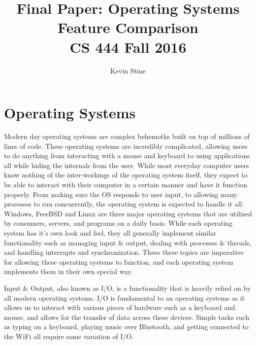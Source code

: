 \documentclass[letterpaper,10pt,draftclsnofoot,onecolumn,titlepage]{IEEEtran}
\def\name{Kevin Stine}
\begin{document}
	\title{\huge Final Paper: Operating Systems Feature Comparison\\CS 444 Fall 2016}
	\author{\large \name}
	\maketitle
	\newpage
	\section*{Operating Systems}
	Modern day operating systems are complex behemoths built on top of millions of lines of code.
	These operating systems are incredibly complicated, allowing users to do anything from interacting with a mouse and keyboard to using applications all while hiding the internals from the user.
	While most everyday computer users know nothing of the inter-workings of the operating system itself, they expect to be able to interact with their computer in a certain manner and have it function properly.
	From making sure the OS responds to user input, to allowing many processes to run concurrently, the operating system is expected to handle it all.
	Windows, FreeBSD and Linux are three major operating systems that are utilized by consumers, servers, and programs on a daily basis.
	While each operating system has it's own look and feel, they all generally implement similar functionality such as managing input \& output, dealing with processes \& threads, and handling interrupts and synchronization.
	These three topics are imperative for allowing these operating systems to function, and each operating system implements them in their own special way.

	Input \& Output, also known as I/O, is a functionality that is heavily relied on by all modern operating systems.
	I/O is fundamental to an operating systems as it allows us to interact with various pieces of hardware such as a keyboard and mouse, and allows for the transfer of data across these devices.
	Simple tasks such as typing on a keyboard, playing music over Bluetooth, and getting connected to the WiFi all require some variation of I/O.
\end{document}
